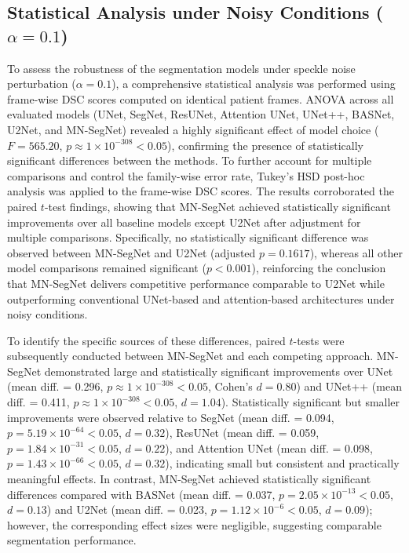 \documentclass[12pt,letterpaper]{article}
\begin{document}
 






\subsection{Statistical Analysis under Noisy Conditions ($\alpha = 0.1$)}

To assess the robustness of the segmentation models under speckle noise perturbation ($\alpha = 0.1$), a comprehensive statistical analysis was performed using frame-wise DSC scores computed on identical patient frames. ANOVA across all evaluated models (UNet, SegNet, ResUNet, Attention UNet, UNet++, BASNet, U2Net, and MN-SegNet) revealed a highly significant effect of model choice ($F = 565.20$, $p \approx 1 \times 10^{-308} < 0.05$), confirming the presence of statistically significant differences between the methods. To further account for multiple comparisons and control the family-wise error rate, Tukey’s HSD post-hoc analysis was applied to the frame-wise DSC scores. The results corroborated the paired $t$-test findings, showing that MN-SegNet achieved statistically significant improvements over all baseline models except U2Net after adjustment for multiple comparisons. Specifically, no statistically significant difference was observed between MN-SegNet and U2Net (adjusted $p = 0.1617$), whereas all other model comparisons remained significant ($p < 0.001$), reinforcing the conclusion that MN-SegNet delivers competitive performance comparable to U2Net while outperforming conventional UNet-based and attention-based architectures under noisy conditions.


To identify the specific sources of these differences, paired $t$-tests were subsequently conducted between MN-SegNet and each competing approach. MN-SegNet demonstrated large and statistically significant improvements over UNet (mean diff. = 0.296, $p \approx 1 \times 10^{-308} < 0.05$, Cohen’s $d = 0.80$) and UNet++ (mean diff. = 0.411, $p \approx 1 \times 10^{-308} < 0.05$, $d = 1.04$). Statistically significant but smaller improvements were observed relative to SegNet (mean diff. = 0.094, $p = 5.19 \times 10^{-64} < 0.05$, $d = 0.32$), ResUNet (mean diff. = 0.059, $p = 1.84 \times 10^{-31} < 0.05$, $d = 0.22$), and Attention UNet (mean diff. = 0.098, $p = 1.43 \times 10^{-66} < 0.05$, $d = 0.32$), indicating small but consistent and practically meaningful effects. In contrast, MN-SegNet achieved statistically significant differences compared with BASNet (mean diff. = 0.037, $p = 2.05 \times 10^{-13} < 0.05$, $d = 0.13$) and U2Net (mean diff. = 0.023, $p = 1.12 \times 10^{-6} < 0.05$, $d = 0.09$); however, the corresponding effect sizes were negligible, suggesting comparable segmentation performance.
\end{document}
